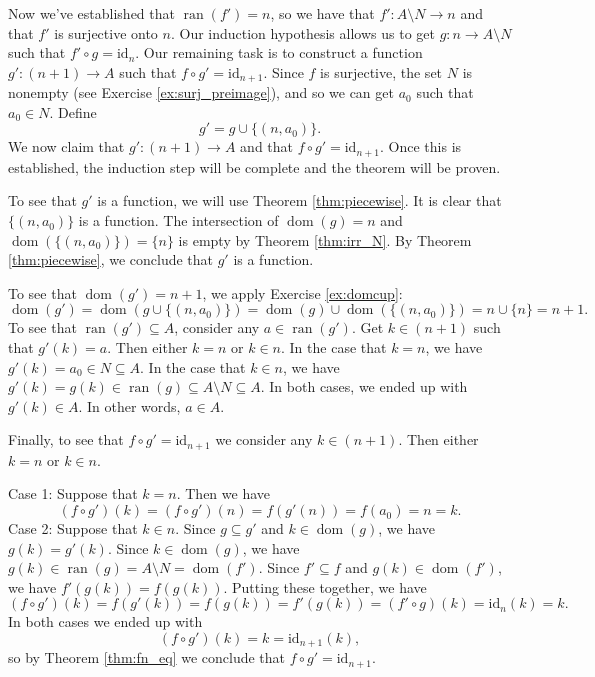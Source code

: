 \documentclass[12pt]{article}
\newcommand{\dom}[1]{\operatorname{dom}(#1)}
\newcommand{\ran}[1]{\operatorname{ran}(#1)}
\newcommand{\id}[1]{\textrm{id}_{#1}}
\newcounter{theorem}
\begin{document}
{Now we've established that $\ran{f'}=n$, so we have that $f':A\setminus N\rightarrow n$ and that $f'$ is surjective onto $n$.
Our induction hypothesis allows us to get $g:n\rightarrow A\setminus N$ such that $f'\circ g=\id{n}$.
Our remaining task is to construct a function $g':(n+1)\rightarrow A$ such that $f\circ g'=\id{n+1}$.
Since $f$ is surjective, the set $N$ is nonempty (see Exercise \ref{ex:surj_preimage}),
and so we can get $a_0$ such that $a_0\in N$. Define
$$
g'=g\cup\{(n,a_0)\}.
$$
We now claim that $g':(n+1)\rightarrow A$ and that $f\circ g'=\id{n+1}$. Once this is established, the induction step will be complete and the theorem will be proven.

To see that $g'$ is a function, we will use Theorem \ref{thm:piecewise}.
It is clear that $\{(n,a_0)\}$ is a function.
The intersection of $\dom{g}=n$ and $\dom{\{(n,a_0)\}}=\{n\}$
is empty by Theorem \ref{thm:irr_N}. By Theorem \ref{thm:piecewise}, we conclude that $g'$ is a function.

To see that $\dom{g'}=n+1$, we apply Exercise \ref{ex:domcup}:
$$
\dom{g'}=\dom{g\cup \{(n,a_0)\}}=\dom{g}\cup\dom{\{(n,a_0)\}}=n\cup\{n\}=n+1.
$$
To see that $\ran{g'}\subseteq A$, consider any $a\in\ran{g'}$.
Get $k\in(n+1)$ such that $g'(k)=a$.
Then either $k=n$ or $k\in n$.
In the case that $k=n$, we have $g'(k)=a_0\in N\subseteq A$.
In the case that $k\in n$, we have $g'(k)=g(k)\in\ran{g}\subseteq A\setminus N\subseteq A$.
In both cases, we ended up with $g'(k)\in A$. In other words, $a\in A$.

Finally, to see that $f\circ g'=\id{n+1}$ we consider any $k\in (n+1)$.
Then either $k=n$ or $k\in n$.

Case 1: Suppose that $k=n$. Then we have
$$
(f\circ g')(k) =
(f\circ g')(n) =
f(g'(n)) =
f(a_0)=n = k.
$$
Case 2: Suppose that $k\in n$.
Since $g\subseteq g'$ and $k\in\dom{g}$, we have $g(k)=g'(k)$.
Since $k\in\dom{g}$, we have $g(k)\in\ran{g}=A\setminus N = \dom{f'}$.
Since $f'\subseteq f$ and $g(k)\in\dom{f'}$, we have $f'(g(k))=f(g(k))$.
Putting these together, we have
$$
(f\circ g')(k) =
f(g'(k)) =
f(g(k)) = 
f'(g(k)) = 
(f'\circ g)(k)=
\id{n}(k)=
k.
$$
In both cases we ended up with 
$$(f\circ g')(k) = k = \id{n+1}(k), $$
so by Theorem \ref{thm:fn_eq} we conclude that $f\circ g'=\id{n+1}$.
}
\end{document}

